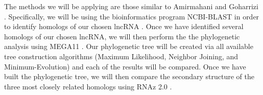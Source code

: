 \documentclass[conference]{IEEEtran}
\begin{document}
The methods we will be applying are those similar to Amirmahani and Goharrizi \cite{amirmahani2018phylogenetic}. 
Specifically, we will be using the bioinformatics program NCBI-BLAST in order to identify homologs of our chosen lncRNA \cite{madden2012blast,blastTool}. 
Once we have identified several homologs of our chosen lncRNA, we will then perform the the phylogenetic analysis using MEGA11 \cite{tamura2021mega11}. 
Our phylogenetic tree will be created via all available tree construction algorithms (Maximum Likelihood, Neighbor Joining, and Minimum-Evolution) and each of the results will be compared. 
Once we have built the phylogenetic tree, we will then compare the secondary structure of the three most closely related homologs using RNAz 2.0 \cite{gruber2010rnaz}.



\end{document}
